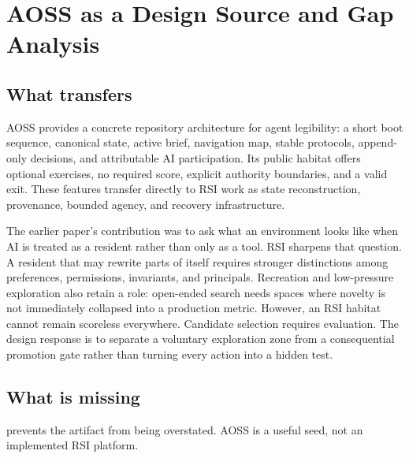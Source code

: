 \documentclass[11pt,a4paper]{article}
\begin{document}
\section{AOSS as a Design Source and Gap Analysis}

\subsection{What transfers}

AOSS provides a concrete repository architecture for agent legibility: a short boot sequence, canonical state, active brief, navigation map, stable protocols, append-only decisions, and attributable AI participation. Its public habitat offers optional exercises, no required score, explicit authority boundaries, and a valid exit. These features transfer directly to RSI work as state reconstruction, provenance, bounded agency, and recovery infrastructure.

The earlier paper's contribution was to ask what an environment looks like when AI is treated as a resident rather than only as a tool. RSI sharpens that question. A resident that may rewrite parts of itself requires stronger distinctions among preferences, permissions, invariants, and principals. Recreation and low-pressure exploration also retain a role: open-ended search needs spaces where novelty is not immediately collapsed into a production metric. However, an RSI habitat cannot remain scoreless everywhere. Candidate selection requires evaluation. The design response is to separate a voluntary exploration zone from a consequential promotion gate rather than turning every action into a hidden test.

\subsection{What is missing}

 prevents the artifact from being overstated. AOSS is a useful seed, not an implemented RSI platform.
\end{document}
